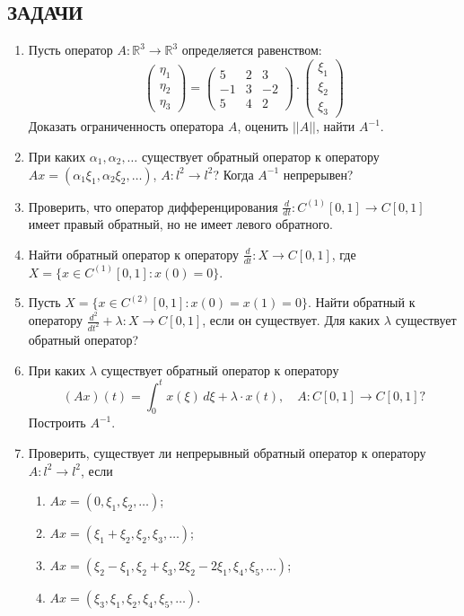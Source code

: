 \documentclass[12pt,a4paper]{article}
\begin{document}
\subsection*{ЗАДАЧИ}
\begin{enumerate}
\item Пусть оператор $A: \mathbb{R}^{3} \rightarrow \mathbb{R}^{3}$ определяется равенством:
$$
\begin{pmatrix} \eta_{1} \\ \eta_{2} \\ \eta_{3}
\end{pmatrix} =
\begin{pmatrix} 5 & 2 & 3 \\ -1 & 3 & -2 \\ 5 & 4 & 2
\end{pmatrix} \cdot
\begin{pmatrix} \xi_{1} \\ \xi_{2} \\ \xi_{3}
\end{pmatrix} $$
Доказать ограниченность оператора $A$, оценить $||A||$, найти $A^{-1}$.

\item При каких $\alpha_{1}, \alpha_{2}, \dots$ существует обратный оператор к оператору $Ax = (\alpha_{1}\xi_{1}, \alpha_{2}\xi_{2}, \dots)$, $A: l^{2} \rightarrow l^{2}$? Когда $A^{-1}$ непрерывен?

\item Проверить, что оператор дифференцирования $\frac{d}{dt}: C^{(1)}[0,1] \rightarrow C[0,1]$ имеет правый обратный, но не имеет левого обратного.

\item Найти обратный оператор к оператору $\frac{d}{dt}: X \rightarrow C[0,1]$, где $X = \{x \in C^{(1)}[0,1] : x(0) = 0\}$.

\item Пусть $X = \{x \in C^{(2)}[0,1] : x(0) = x(1) = 0\}$. Найти обратный к оператору $\frac{d^{2}}{dt^{2}} + \lambda: X \rightarrow C[0,1]$, если он существует. Для каких $\lambda$ существует обратный оператор?

\item При каких $\lambda$ существует обратный оператор к оператору
$$(Ax)(t) = \int_{0}^{t} x(\xi) \, d\xi + \lambda \cdot x(t), \quad A: C[0,1] \rightarrow C[0,1] ?$$
Построить $A^{-1}$.

\item Проверить, существует ли непрерывный обратный оператор к оператору $A: l^{2} \rightarrow l^{2}$, если
\begin{enumerate}[label=\alph*)]
\item $Ax = (0, \xi_{1}, \xi_{2}, \dots)$;
\item $Ax = (\xi_{1} + \xi_{2}, \xi_{2}, \xi_{3}, \dots)$;
\item $Ax = (\xi_{2} - \xi_{1}, \xi_{2} + \xi_{3}, 2\xi_{2} - 2\xi_{1}, \xi_{4}, \xi_{5}, \dots)$;
\item $Ax = (\xi_{3}, \xi_{1}, \xi_{2}, \xi_{4}, \xi_{5}, \dots)$.
\end{enumerate}


\end{enumerate}
\end{document}
